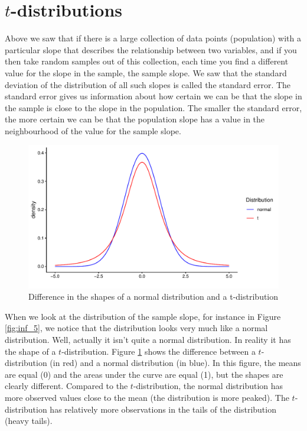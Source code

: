 \documentclass[]{book}\usepackage[]{graphicx}\usepackage[]{color}
\makeatletter
\def\maxwidth{ %
  \ifdim\Gin@nat@width>\linewidth
    \linewidth
  \else
    \Gin@nat@width
  \fi
}
\newenvironment{knitrout}{}{} %
\makeatother
\begin{document}
\section{$t$-distributions}

Above we saw that if there is a large collection of data points (population) with a particular slope that describes the relationship between two variables, and if you then take random samples out of this collection, each time you find a different value for the slope in the sample, the sample slope. We saw that the standard deviation of the distribution of all such slopes is called the standard error. The standard error gives us information about how certain we can be that the slope in the sample is close to the slope in the population. The smaller the standard error, the more certain we can be that the population slope has a value in the neighbourhood of the value for the sample slope.



\begin{knitrout}
\color{fgcolor}\begin{figure}

{\centering \includegraphics[width=\maxwidth]{figure/inf_8-1} 

}

\caption[Difference in the shapes of a normal distribution and a t-distribution]{Difference in the shapes of a normal distribution and a t-distribution}\label{fig:inf_8}
\end{figure}


\end{knitrout}



When we look at the distribution of the sample slope, for instance in Figure \ref{fig:inf_5}, we notice that the distribution looks very much like a normal distribution. Well, actually it isn't quite a normal distribution. In reality it has the shape of a $t$-distribution. Figure \ref{fig:inf_8} shows the difference between a $t$-distribution (in red) and a normal distribution (in blue). In this figure, the means are equal (0) and the areas under the curve are equal (1), but the shapes are clearly different. Compared to the $t$-distribution, the normal distribution has more observed values close to the mean (the distribution is more peaked). The $t$-distribution has relatively more observations in the tails of the distribution (heavy tails).
\end{document}

